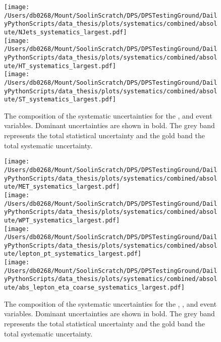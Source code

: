 \begin{figure*}[hp]
	\centering
	\texttt{[image: /Users/db0268/Mount/SoolinScratch/DPS/DPSTestingGround/DailyPythonScripts/data\_thesis/plots/systematics/combined/absolute/NJets\_systematics\_largest.pdf]} \\
	\texttt{[image: /Users/db0268/Mount/SoolinScratch/DPS/DPSTestingGround/DailyPythonScripts/data\_thesis/plots/systematics/combined/absolute/HT\_systematics\_largest.pdf]} \\
	\texttt{[image: /Users/db0268/Mount/SoolinScratch/DPS/DPSTestingGround/DailyPythonScripts/data\_thesis/plots/systematics/combined/absolute/ST\_systematics\_largest.pdf]} \\
	\caption[The composition of the systematic uncertainties for the \NJET{}, \HT{} and \ST{} event variables. Dominant uncertainties are shown in bold. The grey band represents the total statistical uncertainty and the gold band the total systematic uncertainty.]{The composition of the systematic uncertainties for the \NJET{}, \HT{} and \ST{} event variables. Dominant uncertainties are shown in bold. The grey band represents the total statistical uncertainty and the gold band the total systematic uncertainty.}
	\label{fig:Systabs1}
\end{figure*}
\begin{figure*}[hp]
	\centering
	\texttt{[image: /Users/db0268/Mount/SoolinScratch/DPS/DPSTestingGround/DailyPythonScripts/data\_thesis/plots/systematics/combined/absolute/MET\_systematics\_largest.pdf]} \\
	\texttt{[image: /Users/db0268/Mount/SoolinScratch/DPS/DPSTestingGround/DailyPythonScripts/data\_thesis/plots/systematics/combined/absolute/WPT\_systematics\_largest.pdf]} \\
	\texttt{[image: /Users/db0268/Mount/SoolinScratch/DPS/DPSTestingGround/DailyPythonScripts/data\_thesis/plots/systematics/combined/absolute/lepton\_pt\_systematics\_largest.pdf]} \\
	\texttt{[image: /Users/db0268/Mount/SoolinScratch/DPS/DPSTestingGround/DailyPythonScripts/data\_thesis/plots/systematics/combined/absolute/abs\_lepton\_eta\_coarse\_systematics\_largest.pdf]} \\
	\caption[The composition of the systematic uncertainties for the \ptmiss{}, \WPT{}, \LPT{} and \LETA{} event variables. Dominant uncertainties are shown in bold. The grey band represents the total statistical uncertainty and the gold band the total systematic uncertainty.]{The composition of the systematic uncertainties for the \ptmiss{}, \WPT{}, \LPT{} and \LETA{} event variables. Dominant uncertainties are shown in bold. The grey band represents the total statistical uncertainty and the gold band the total systematic uncertainty.}
	\label{fig:Systabs2}
\end{figure*}